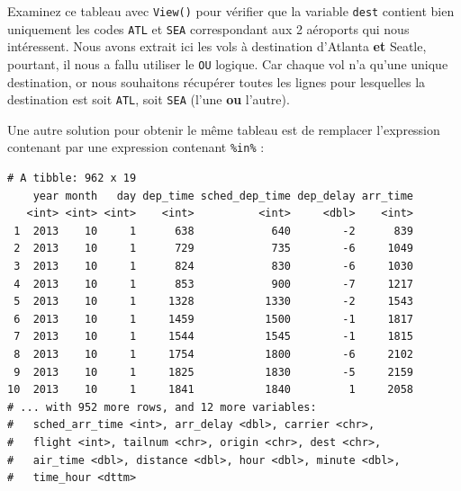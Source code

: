 \documentclass[
  a4paper,
]{article}
\newenvironment{Shaded}{\begin{snugshade}}{\end{snugshade}}
\newcommand{\DecValTok}[1]{\textcolor[rgb]{0.69,0.50,0.00}{#1}}
\newcommand{\KeywordTok}[1]{\textcolor[rgb]{0.12,0.11,0.11}{\textbf{#1}}}
\newcommand{\NormalTok}[1]{\textcolor[rgb]{0.12,0.11,0.11}{#1}}
\newcommand{\OperatorTok}[1]{\textcolor[rgb]{0.12,0.11,0.11}{#1}}
\newcommand{\StringTok}[1]{\textcolor[rgb]{0.75,0.01,0.01}{#1}}
\begin{document}
Examinez ce tableau avec \texttt{View()} pour vérifier que la variable \texttt{dest} contient bien uniquement les codes \texttt{ATL} et \texttt{SEA} correspondant aux 2 aéroports qui nous intéressent. Nous avons extrait ici les vols à destination d'Atlanta \textbf{et} Seatle, pourtant, il nous a fallu utiliser le \texttt{OU} logique. Car chaque vol n'a qu'une unique destination, or nous souhaitons récupérer toutes les lignes pour lesquelles la destination est soit \texttt{ATL}, soit \texttt{SEA} (l'une \textbf{ou} l'autre).

Une autre solution pour obtenir le même tableau est de remplacer l'expression contenant \texttt{\textbar{}} par une expression contenant \texttt{\%in\%} :

\begin{Shaded}
\end{Shaded}

\begin{verbatim}
# A tibble: 962 x 19
    year month   day dep_time sched_dep_time dep_delay arr_time
   <int> <int> <int>    <int>          <int>     <dbl>    <int>
 1  2013    10     1      638            640        -2      839
 2  2013    10     1      729            735        -6     1049
 3  2013    10     1      824            830        -6     1030
 4  2013    10     1      853            900        -7     1217
 5  2013    10     1     1328           1330        -2     1543
 6  2013    10     1     1459           1500        -1     1817
 7  2013    10     1     1544           1545        -1     1815
 8  2013    10     1     1754           1800        -6     2102
 9  2013    10     1     1825           1830        -5     2159
10  2013    10     1     1841           1840         1     2058
# ... with 952 more rows, and 12 more variables:
#   sched_arr_time <int>, arr_delay <dbl>, carrier <chr>,
#   flight <int>, tailnum <chr>, origin <chr>, dest <chr>,
#   air_time <dbl>, distance <dbl>, hour <dbl>, minute <dbl>,
#   time_hour <dttm>
\end{verbatim}
\end{document}
